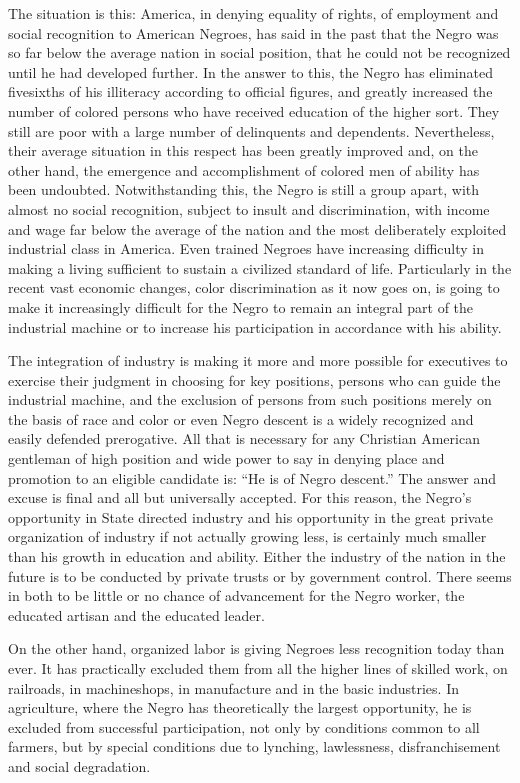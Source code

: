 \documentclass[letterpaper,10pt,english]{jupyterBook}
\begin{document}
\sphinxAtStartPar
The situation is this: America, in denying equality of rights, of employment and social recognition to American Negroes, has said in the past that the Negro was so far below the average nation in social position, that he could not be recognized until he had developed further. In the answer to this, the Negro has eliminated five\sphinxhyphen{}sixths of his illiteracy according to official figures, and greatly increased the number of colored persons who have received education of the higher sort. They still are poor with a large number of delinquents and dependents. Nevertheless, their average situation in this respect has been greatly improved and, on the other hand, the emergence and accomplishment of colored men of ability has been undoubted. Notwithstanding this, the Negro is still a group apart, with almost no social recognition, subject to insult and discrimination, with income and wage far below the average of the nation and the most deliberately exploited industrial class in America. Even trained Negroes have increasing difficulty in making a living sufficient to sustain a civilized standard of life. Particularly in the recent vast economic changes, color discrimination as it now goes on, is going to make it increasingly difficult for the Negro to remain an integral part of the industrial machine or to increase his participation in accordance with his ability.

\sphinxAtStartPar
The integration of industry is making it more and more possible for executives to exercise their judgment in choosing for key positions, persons who can guide the industrial machine, and the exclusion of persons from such positions merely on the basis of race and color or even Negro descent is a widely recognized and easily defended prerogative. All that is necessary for any Christian American gentleman of high position and wide power to say in denying place and promotion to an eligible candidate is: “He is of Negro descent.” The answer and excuse is final and all but universally accepted. For this reason, the Negro’s opportunity in State directed industry and his opportunity in the great private organization of industry if not actually growing less, is certainly much smaller than his growth in education and ability. Either the industry of the nation in the future is to be conducted by private trusts or by government control. There seems in both to be little or no chance of advancement for the Negro worker, the educated artisan and the educated leader.

\sphinxAtStartPar
On the other hand, organized labor is giving Negroes less recognition today than ever. It has practically excluded them from all the higher lines of skilled work, on railroads, in machine\sphinxhyphen{}shops, in manufacture and in the basic industries. In agriculture, where the Negro has theoretically the largest opportunity, he is excluded from successful participation, not only by conditions common to all farmers, but by special conditions due to lynching, lawlessness, disfranchisement and social degradation.
\end{document}
